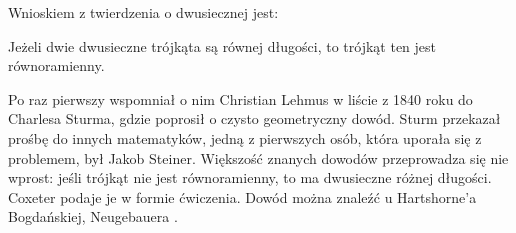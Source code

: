 %

Wnioskiem z twierdzenia o dwusiecznej jest:

\begin{theorem}
    \label{theorem_steiner_lehmus}%
	Jeżeli dwie dwusieczne trójkąta są równej długości, to trójkąt ten jest równoramienny.
\end{theorem}

Po raz pierwszy wspomniał o nim Christian Lehmus w liście z 1840 roku do Charlesa Sturma, gdzie poprosił o czysto geometryczny dowód.
%
%
Sturm przekazał prośbę do innych matematyków, jedną z pierwszych osób, która uporała się z problemem, był Jakob Steiner.
%
Większość znanych dowodów przeprowadza się nie wprost: jeśli trójkąt nie jest równoramienny, to ma dwusieczne różnej długości.
Coxeter \cite[s. 9]{coxeter_1991} podaje je w formie ćwiczenia.
Dowód można znaleźć u Hartshorne'a \cite[s. 11,]{hartshorne2000} Bogdańskiej, Neugebauera \cite[s. 74]{neugebauer_2018}.

%